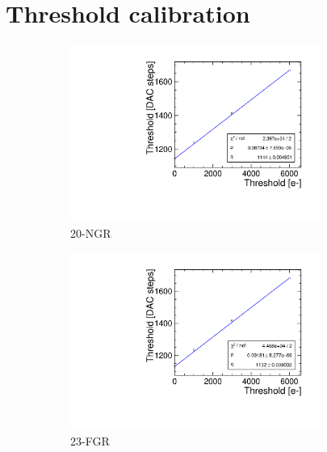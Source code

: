 \section{Threshold calibration}\label{sec:appendix_threshold_calibration}
\begin{figure}[htbp] \centering
  \begin{subfigure}[b]{0.45\textwidth}
    \includegraphics[width=0.9\textwidth]{./figures/Calibration/THLcalibration_W0019_G07.pdf}
    \caption{20-NGR}
  \end{subfigure} \hfill
  \begin{subfigure}[b]{0.45\textwidth}
    \includegraphics[width=0.9\textwidth]{./figures/Calibration/THLcalibration_W0019_F07.pdf}
    \caption{23-FGR}
  \end{subfigure}\\
  \begin{subfigure}[b]{0.45\textwidth}

\end{subfigure}
\end{figure}
